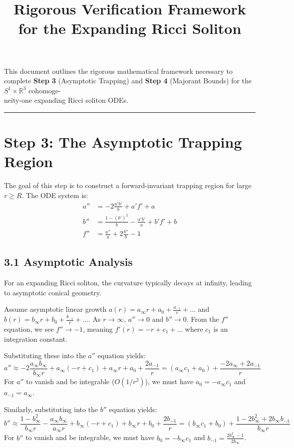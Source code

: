 \documentclass[12pt]{article}
\title{\textbf{Rigorous Verification Framework for the Expanding Ricci Soliton}}
\date{}
\begin{document}
\maketitle

This document outlines the rigorous mathematical framework necessary to complete \textbf{Step 3} (Asymptotic Trapping) and \textbf{Step 4} (Majorant Bounds) for the $S^1 \times \mathbb{R}^3$ cohomoge-\\neity-one expanding Ricci soliton ODEs. 

\vspace{1em}
\hrule
\vspace{1em}

\section*{Step 3: The Asymptotic Trapping Region}

The goal of this step is to construct a forward-invariant trapping region for large $r \geq R$. The ODE system is:
\begin{align}
a'' &= -2\frac{a'b'}{b} + a'f' + a \\
b'' &= \frac{1 - (b')^2}{b} - \frac{a'b'}{a} + b'f' + b \\
f'' &= \frac{a''}{a} + 2\frac{b''}{b} - 1
\end{align}

\subsection*{3.1 Asymptotic Analysis}
For an expanding Ricci soliton, the curvature typically decays at infinity, leading to asymptotic conical geometry. 

Assume asymptotic linear growth $a(r) = a_\infty r + a_0 + \frac{a_{-1}}{r} + \dots$ and $b(r) = b_\infty r + b_0 + \frac{b_{-1}}{r} + \dots$. As $r \to \infty$, $a'' \to 0$ and $b'' \to 0$. From the $f''$ equation, we see $f'' \to -1$, meaning $f'(r) = -r + c_1 + \dots$ where $c_1$ is an integration constant.

Substituting these into the $a''$ equation yields:
\[ a'' \approx -2\frac{a_\infty b_\infty}{b_\infty r} + a_\infty(-r + c_1) + a_\infty r + a_0 + \frac{2a_{-1}}{r} = (a_\infty c_1 + a_0) + \frac{-2a_\infty + 2a_{-1}}{r} \]
For $a''$ to vanish and be integrable ($O(1/r^2)$), we must have $a_0 = -a_\infty c_1$ and $a_{-1} = a_\infty$.

Similarly, substituting into the $b''$ equation yields:
\[ b'' \approx \frac{1 - b_\infty^2}{b_\infty r} - \frac{a_\infty b_\infty}{a_\infty r} + b_\infty(-r + c_1) + b_\infty r + b_0 + \frac{2b_{-1}}{r} = (b_\infty c_1 + b_0) + \frac{1 - 2b_\infty^2 + 2b_\infty b_{-1}}{b_\infty r} \]
For $b''$ to vanish and be integrable, we must have $b_0 = -b_\infty c_1$ and $b_{-1} = \frac{2b_\infty^2 - 1}{2b_\infty}$.
\end{document}

